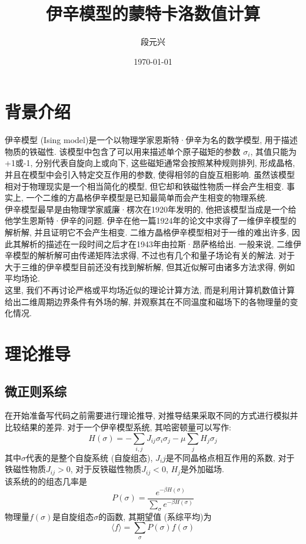 \documentclass[UTF8]{ctexart}
\title{伊辛模型的蒙特卡洛数值计算}
\author{段元兴}
\date{\today}
\begin{document}
\maketitle
\thispagestyle{empty}
\setcounter{page}{1}
\newpage
\tableofcontents
\newpage
    \section{背景介绍}
        \indent 伊辛模型 (Ising model)是一个以物理学家恩斯特·伊辛为名的数学模型, 用于描述物质的铁磁性.
        该模型中包含了可以用来描述单个原子磁矩的参数 $\sigma _{i}$, 其值只能为+1或-1, 分别代表自旋向上或向下,
        这些磁矩通常会按照某种规则排列, 形成晶格, 并且在模型中会引入特定交互作用的参数, 使得相邻的自旋互相影响.
        虽然该模型相对于物理现实是一个相当简化的模型, 但它却和铁磁性物质一样会产生相变.
        事实上, 一个二维的方晶格伊辛模型是已知最简单而会产生相变的物理系统.\\
        \indent 伊辛模型最早是由物理学家威廉·楞次在1920年发明的, 他把该模型当成是一个给他学生恩斯特·伊辛的问题.
        伊辛在他一篇1924年的论文中求得了一维伊辛模型的解析解, 并且证明它不会产生相变. 二维方晶格伊辛模型相对于一维的难出许多,
        因此其解析的描述在一段时间之后才在1943年由拉斯·昂萨格给出. 一般来说, 二维伊辛模型的解析解可由传递矩阵法求得,
        不过也有几个和量子场论有关的解法. 对于大于三维的伊辛模型目前还没有找到解析解, 但其近似解可由诸多方法求得, 例如平均场论.\\
        \indent 这里, 我们不再讨论严格或平均场近似的理论计算方法, 而是利用计算机数值计算给出二维周期边界条件有外场的解,
        并观察其在不同温度和磁场下的各物理量的变化情况.
    \section{理论推导}
        \subsection{微正则系综}
            \indent 在开始准备写代码之前需要进行理论推导, 对推导结果采取不同的方式进行模拟并比较结果的差异. 对于一个伊辛模型系统,
            其哈密顿量可以写作:
            \begin{equation}
                H(\sigma)=-\sum\limits_{i,j}J_{ij}\sigma_i\sigma_j-\mu\sum\limits_jH_j\sigma_j
            \end{equation}
            其中$\sigma$代表的是整个自旋系统 (自旋组态), $J_ij$是不同晶格点相互作用的系数, 对于铁磁性物质$J_{ij}>0$, 对于反铁磁性物质$J_{ij}<0$,
            $H_j$是外加磁场.\\
            \indent 该系统的的组态几率是
            \begin{equation}
                P(\sigma)=\dfrac{e^{-\beta H(\sigma)}}{\sum\limits_\sigma e^{-\beta H(\sigma)}}
            \end{equation}
            物理量$f(\sigma)$是自旋组态$\sigma$的函数, 其期望值 (系综平均)为
            \begin{equation}
                \langle f\rangle=\sum\limits_\sigma P(\sigma)f(\sigma)
            \end{equation}
\end{document}

